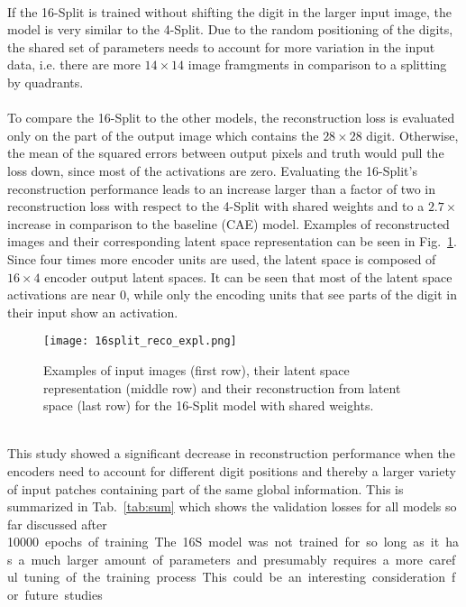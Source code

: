 \documentclass[../../main.tex]{subfiles}
\begin{document}
\\
If the 16-Split is trained without shifting the digit in the larger input image, the model is very similar to the 4-Split. Due to the random positioning of the digits, the shared set of parameters needs to account for more variation in the input data, i.e. there are more $14\times14$ image framgments in comparison to a splitting by quadrants.\\
\\
To compare the 16-Split to the other models, the reconstruction loss is evaluated only on the part of the output image which contains the $28\times28$ digit. Otherwise, the mean of the squared errors between output pixels and truth would pull the loss down, since most of the activations are zero. Evaluating the 16-Split's reconstruction performance leads to an increase larger than a factor of two in reconstruction loss with respect to the 4-Split with shared weights and to a $2.7\times$ increase in comparison to the baseline (CAE) model. Examples of reconstructed images and their corresponding latent space representation can be seen in Fig.~\ref{fig:expl_16s}. Since four times more encoder units are used, the latent space is composed of $16\times4$ encoder output latent spaces. It can be seen that most of the latent space activations are near 0, while only the encoding units that see parts of the digit in their input show an activation.\\
\begin{figure}[htp]
			\begin{center}
				\texttt{[image: 16split\_reco\_expl.png]}
				\caption{Examples of input images (first row), their latent space representation (middle row) and their reconstruction from latent space (last row) for the 16-Split model with shared weights.}
				\label{fig:expl_16s}
			\end{center}
\end{figure}
\\
This study showed a significant decrease in reconstruction performance when the encoders need to account for different digit positions and thereby a larger variety of input patches containing part of the same global information. This is summarized in Tab.~\ref{tab:sum} which shows the validation losses for all models so far discussed after \SI{10000} epochs of training. The 16S model was not trained for so long as it has a much larger amount of parameters and presumably requires a more careful tuning of the training process. This could be an interesting consideration for future studies.\\
\end{document}
